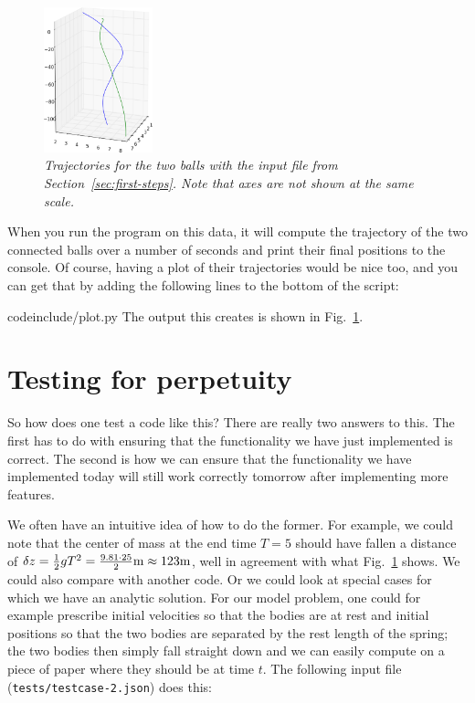 \documentclass{article}
\begin{document}
\begin{figure}
  \begin{center}
    \vspace*{-24pt}
    \includegraphics[width=0.28\textwidth]{figures/testcase-1.png}
    \vspace*{-12pt}
  \end{center}
  \caption{\it Trajectories for the two balls with the input file from
    Section~\ref{sec:first-steps}. Note that axes are not shown at the same
    scale.}
  \vspace*{-3mm}
  \label{fig:testcase-1}
\end{figure}

When you run the program on this data, it will compute the trajectory of the
two connected balls over a number of seconds and print their final positions
to the console.
Of course, having a plot of their trajectories would be nice too, and you can
get that by adding the following lines to the bottom of the script:

{codeinclude/plot.py}
The output this creates is shown in Fig.~\ref{fig:testcase-1}.


\section{Testing for perpetuity}
\label{sec:testing}


So how does one test a code like this? There are really two answers to
this. The first has to do with ensuring that the functionality we have just
implemented is correct. The second is how we can ensure that the functionality
we have implemented today will still work correctly tomorrow after
implementing more features.

We often have an intuitive idea of how to do the former. For example, we could
note that the center of mass at the end time $T=5$ should have fallen a
distance of $\delta z=\frac 12 g T^2=\frac{9.81 \cdot 25}{2}\textrm m\approx
123\textrm{m}$, well in agreement with what Fig.~\ref{fig:testcase-1} shows. We
could also compare with another code. Or we could look at special cases for
which we have 
an analytic solution. For our model problem, one could for example prescribe
initial velocities so that the bodies are at rest and initial positions so
that the two bodies are separated by the rest length of the spring; the two
bodies then simply fall straight down and we can easily compute on a piece of
paper where they should be at time $t$. The following input file
(\texttt{tests/testcase-2.json}) does this:

\end{document}

